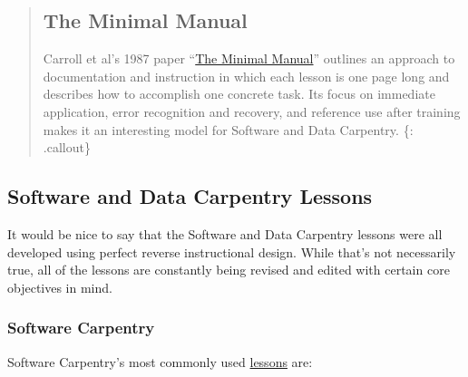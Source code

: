 \begin{quote}
\subsection{The Minimal Manual}\label{the-minimal-manual}

Carroll et al's 1987 paper
``\href{\{\{\%20page.root\%20\}\}/files/papers/carroll-minimal-manual-1987.pdf}{The
Minimal Manual}'' outlines an approach to documentation and instruction
in which each lesson is one page long and describes how to accomplish
one concrete task. Its focus on immediate application, error recognition
and recovery, and reference use after training makes it an interesting
model for Software and Data Carpentry. \{: .callout\}
\end{quote}

\subsection{Software and Data Carpentry
Lessons}\label{software-and-data-carpentry-lessons}

It would be nice to say that the Software and Data Carpentry lessons
were all developed using perfect reverse instructional design. While
that's not necessarily true, all of the lessons are constantly being
revised and edited with certain core objectives in mind.

\subsubsection{Software Carpentry}\label{software-carpentry}

Software Carpentry's most commonly used
\href{\{\{\%20site.swc\_site\%20\}\}/lessons/}{lessons} are:

